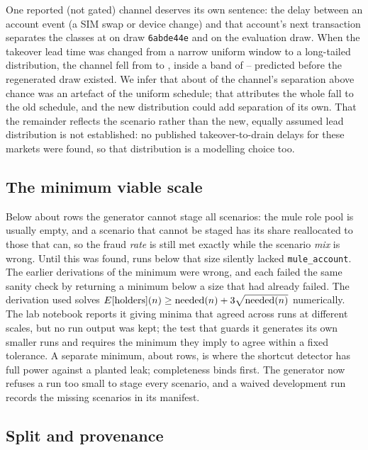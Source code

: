 One reported (not gated) channel deserves its own sentence: the delay between an account event
(a SIM swap or device change) and that account's next transaction separates the classes at
\nEventDelayAUC{} on draw \texttt{6abde44e} and \nEventDelayAUCB{} on the evaluation draw. When the
takeover lead time was changed from a narrow uniform window to a
long-tailed distribution, the channel fell from \nEventDelayBefore{} to \nEventDelayAfter{},
inside a band of \nEventDelayBandLow{}--\nEventDelayBandHigh{} predicted before the regenerated
draw existed. We infer that about \nEventDelayShare{} of the channel's separation above chance was an artefact of
the uniform schedule; that attributes the whole fall to the old schedule, and the new distribution
could add separation of its own. That the remainder reflects the scenario rather than the new,
equally assumed lead distribution is not established: no published takeover-to-drain delays for
these markets were found, so that distribution is a modelling choice too.

\subsection{The minimum viable scale}

Below about \nMinRows{} rows the generator cannot stage all \nScenarios{} scenarios: the mule role pool
is usually empty, and a scenario that cannot be staged has its share reallocated to those that
can, so the fraud \emph{rate} is still met exactly while the scenario \emph{mix} is wrong. Until
this was found, runs below that size silently lacked \texttt{mule\_account}. The earlier derivations
of the minimum were wrong, and each failed the same sanity check by returning a minimum below a size
that had already failed. The derivation used solves $E[\text{holders}](n) \ge \text{needed}(n) +
3\sqrt{\text{needed}(n)}$ numerically. The lab notebook reports it giving minima that agreed across
runs at different scales, but no run output was kept; the test that
guards it generates its own smaller runs and requires the minimum they imply to agree within a fixed
tolerance. A separate minimum, about \nDetectorMinRows{} rows, is where the shortcut detector
has full power against a planted leak; completeness binds first. The generator now refuses a run
too small to stage every scenario, and a waived development run records the missing scenarios in
its manifest.

\subsection{Split and provenance}

